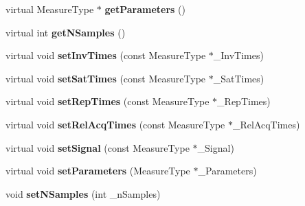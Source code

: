 \begin{DoxyCompactItemize}
\item 
\hypertarget{class_ox_1_1_functions_t1_ae135536ab79b836d77286fec0efdc6c8}{virtual Measure\-Type $\ast$ {\bfseries get\-Parameters} ()}\label{class_ox_1_1_functions_t1_ae135536ab79b836d77286fec0efdc6c8}

\item 
\hypertarget{class_ox_1_1_functions_t1_a70e137063cc2e6ef086046e596af4a15}{virtual int {\bfseries get\-N\-Samples} ()}\label{class_ox_1_1_functions_t1_a70e137063cc2e6ef086046e596af4a15}

\item 
\hypertarget{class_ox_1_1_functions_t1_a5a96e27da44213d1b4f4a7e91d8e0347}{virtual void {\bfseries set\-Inv\-Times} (const Measure\-Type $\ast$\-\_\-\-Inv\-Times)}\label{class_ox_1_1_functions_t1_a5a96e27da44213d1b4f4a7e91d8e0347}

\item 
\hypertarget{class_ox_1_1_functions_t1_a1acb713d0162afb45e0faa1b6252f921}{virtual void {\bfseries set\-Sat\-Times} (const Measure\-Type $\ast$\-\_\-\-Sat\-Times)}\label{class_ox_1_1_functions_t1_a1acb713d0162afb45e0faa1b6252f921}

\item 
\hypertarget{class_ox_1_1_functions_t1_ad221400dbedf2ac324f0e80105a261fb}{virtual void {\bfseries set\-Rep\-Times} (const Measure\-Type $\ast$\-\_\-\-Rep\-Times)}\label{class_ox_1_1_functions_t1_ad221400dbedf2ac324f0e80105a261fb}

\item 
\hypertarget{class_ox_1_1_functions_t1_a278e7e3d4989fb9305cdc0ec6160f1a8}{virtual void {\bfseries set\-Rel\-Acq\-Times} (const Measure\-Type $\ast$\-\_\-\-Rel\-Acq\-Times)}\label{class_ox_1_1_functions_t1_a278e7e3d4989fb9305cdc0ec6160f1a8}

\item 
\hypertarget{class_ox_1_1_functions_t1_a73bd06989de4d204d8e654c583cd3ce3}{virtual void {\bfseries set\-Signal} (const Measure\-Type $\ast$\-\_\-\-Signal)}\label{class_ox_1_1_functions_t1_a73bd06989de4d204d8e654c583cd3ce3}

\item 
\hypertarget{class_ox_1_1_functions_t1_a27bdccbcb4aa30b945453a33b25fdbf7}{virtual void {\bfseries set\-Parameters} (Measure\-Type $\ast$\-\_\-\-Parameters)}\label{class_ox_1_1_functions_t1_a27bdccbcb4aa30b945453a33b25fdbf7}

\item 
\hypertarget{class_ox_1_1_functions_t1_ac817cab2256c8495bc6979bb1fca2688}{void {\bfseries set\-N\-Samples} (int \-\_\-n\-Samples)}\label{class_ox_1_1_functions_t1_ac817cab2256c8495bc6979bb1fca2688}


\end{DoxyCompactItemize}
